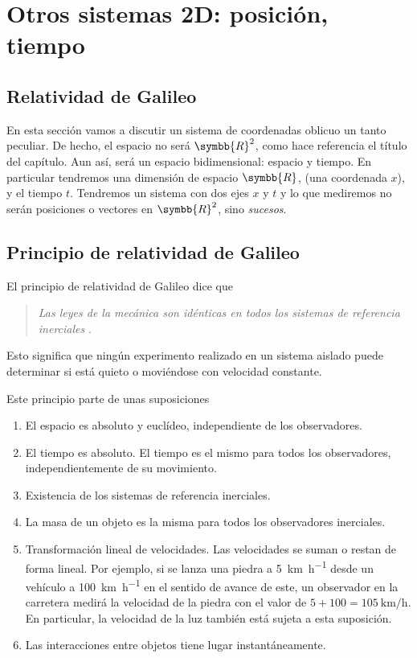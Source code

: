 %

\chapter{Otros sistemas 2D: posición, tiempo}
\section{Relatividad de Galileo}
En esta sección vamos a discutir un sistema de coordenadas oblicuo un tanto peculiar. De
hecho, el espacio no será $\symbb{R}^2$, como hace referencia el título del capítulo.
Aun así, será un espacio bidimensional: espacio y tiempo.
En particular tendremos una dimensión de espacio $\symbb{R}$, (una coordenada $x$), y el
tiempo $t$. Tendremos un sistema con dos ejes $x$ y $t$ y lo que mediremos no serán
posiciones o vectores en $\symbb{R}^2$, sino \emph{sucesos}.

\section{Principio de relatividad de Galileo}
El principio de relatividad de Galileo dice que
\begin{quote}
  \emph{%
    Las leyes de la mecánica son idénticas en todos los sistemas de referencia inerciales
    \footnotemark{}
  }.
\end{quote}
Esto significa que ningún experimento realizado en un sistema aislado puede determinar si
está quieto o moviéndose con velocidad constante.

Este principio parte de unas suposiciones
\begin{enumerate}
\item El espacio es absoluto y euclídeo, independiente de los observadores.
\item El tiempo es absoluto. El tiempo es el mismo para todos los observadores,
  independientemente de su movimiento.
\item Existencia de los sistemas de referencia inerciales.
\item La masa de un objeto es la misma para todos los observadores inerciales.
\item Transformación lineal de velocidades. Las velocidades se suman o restan de forma
  lineal. Por ejemplo, si se lanza una piedra a \qty{5}{\kilo\metre\per\hour} desde un
  vehículo a \qty{100}{\kilo\metre\per\hour} en el sentido de avance de este, un
  observador en la carretera medirá la velocidad de la piedra con el valor de
  $5 + 100 = \qty{105}{\kilo\metre\per\hour}$. En particular, la velocidad de la luz
  también está sujeta a esta suposición.
\item Las interacciones entre objetos tiene lugar instantáneamente.
\end{enumerate}


